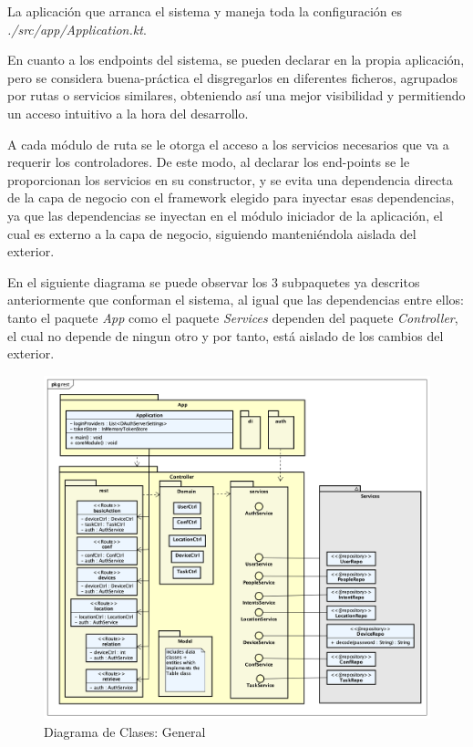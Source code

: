     La aplicación que arranca el sistema y maneja toda la configuración es \textit{./src/app/Application.kt}.
    
    En cuanto a los endpoints del sistema, se pueden declarar en la propia aplicación, pero se considera buena-práctica el disgregarlos en diferentes ficheros, agrupados por rutas o servicios similares, obteniendo así una mejor visibilidad y permitiendo un acceso intuitivo a la hora del desarrollo.
    
    A cada módulo de ruta se le otorga el acceso a los servicios necesarios que va a requerir los controladores. De este modo, al declarar los end-points se le proporcionan los servicios en su constructor, y se evita una dependencia directa de la capa de negocio con el framework elegido para inyectar esas dependencias, ya que las dependencias se inyectan en el módulo iniciador de la aplicación, el cual es externo a la capa de negocio, siguiendo manteniéndola aislada del exterior.
    
    En el siguiente diagrama se puede observar los 3 subpaquetes ya descritos anteriormente que conforman el sistema, al igual que las dependencias entre ellos: tanto el paquete \textit{App} como el paquete \textit{Services} dependen del paquete \textit{Controller}, el cual no depende de ningun otro y por tanto, está aislado de los cambios del exterior.
    
    \begin{figure}[H]
    \centering
    \includegraphics[width=14cm]{./img/arch/back/diag.class.2.png}
    \caption{Diagrama de Clases: General}
    \label{fig:diagram.app}
\end{figure}

